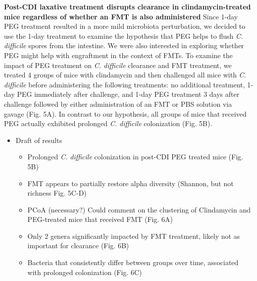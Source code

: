 \documentclass[
  11pt,
]{article}
\providecommand{\tightlist}{%
  \setlength{\itemsep}{0pt}\setlength{\parskip}{0pt}}
\begin{document}
\textbf{Post-CDI laxative treatment disrupts clearance in
clindamycin-treated mice regardless of whether an FMT is also
administered} Since 1-day PEG treatment resulted in a more mild
microbiota perturbation, we decided to use the 1-day treatment to
examine the hypothesis that PEG helps to flush \emph{C. difficile}
spores from the intestine. We were also interested in exploring whether
PEG might help with engraftment in the context of FMTs. To examine the
impact of PEG treatment on \emph{C. difficile} clearance and FMT
treatment, we treated 4 groups of mice with clindamycin and then
challenged all mice with \emph{C. difficile} before administering the
following treatments: no additional treatment, 1-day PEG immediately
after challenge, and 1-day PEG treatment 3 days after challenge followed
by either administration of an FMT or PBS solution via gavage (Fig. 5A).
In contrast to our hypothesis, all groups of mice that received PEG
actually exhibited prolonged \emph{C. difficile} colonization (Fig. 5B).

\begin{itemize}
\item
  Draft of results

  \begin{itemize}
  \tightlist
  \item
    Prolonged \emph{C. difficile} colonization in post-CDI PEG treated
    mice (Fig. 5B)
  \item
    FMT appears to partially restore alpha diversity (Shannon, but not
    richness Fig. 5C-D)
  \item
    PCoA (necessary?) Could comment on the clustering of Clindamycin and
    PEG-treated mice that received FMT (Fig. 6A)
  \item
    Only 2 genera significantly impacted by FMT treatment, likely not as
    important for clearance (Fig. 6B)
  \item
    Bacteria that consistently differ between groups over time,
    associated with prolonged colonization (Fig. 6C)
  \end{itemize}
\end{itemize}
\end{document}
